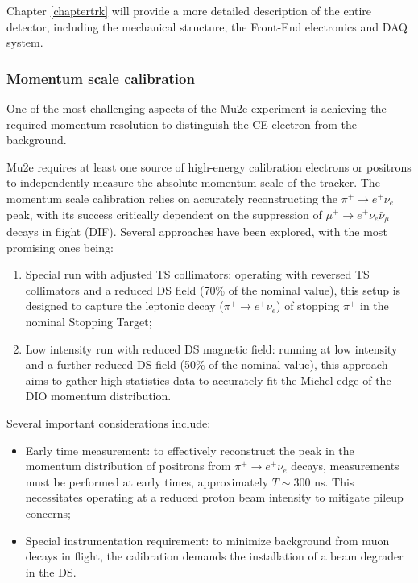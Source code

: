 Chapter \ref{chaptertrk} will provide a more detailed description of the entire detector, 
including the mechanical structure, the Front-End electronics and 
DAQ system.
\subsubsection{Momentum scale calibration}
One of the most challenging aspects of the Mu2e experiment is achieving the 
required momentum resolution to distinguish the CE electron from the background.

Mu2e requires at least one source of high-energy calibration electrons or 
positrons to independently measure the absolute momentum scale of the tracker. 
The momentum scale calibration relies on accurately reconstructing the 
$\pi^+ \rightarrow e^+ \nu_e$ peak, with its success critically dependent on the 
suppression of $\mu^+ \rightarrow e^+ \nu_e \bar{\nu}_\mu$ decays in flight (DIF). 
Several approaches have been explored, with the most promising ones being:

\begin{enumerate}
    \item Special run with adjusted TS collimators: operating with 
    reversed TS collimators and a reduced DS field 
    (70\% of the nominal value), this setup is designed to capture the 
    leptonic decay ($\pi^+ \rightarrow e^+ \nu_e$) of stopping $\pi^+$ in the nominal Stopping Target;
    
    \item Low intensity run with reduced DS magnetic field: 
    running at low intensity and a further reduced DS field (50\% of the nominal value), 
    this approach aims to gather high-statistics data to accurately fit 
    the Michel edge of the DIO momentum distribution.
\end{enumerate}

Several important considerations include:

\begin{itemize}
    \item Early time measurement: to effectively 
    reconstruct the peak in the momentum distribution 
    of positrons from $\pi^+ \rightarrow e^+ \nu_e$ decays, 
    measurements must be performed at early times, approximately 
    $T \sim 300$ ns. This necessitates operating at a reduced proton 
    beam intensity to mitigate pileup concerns;
    
    \item Special instrumentation requirement: to minimize 
    background from muon decays in flight, the calibration demands 
    the installation of a beam degrader in the DS.
\end{itemize}

